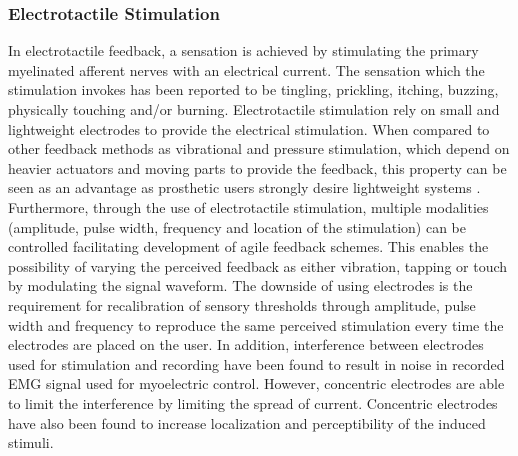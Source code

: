 \subsubsection{Electrotactile Stimulation} \label{E-stim}

In electrotactile feedback, a sensation is achieved by stimulating the primary myelinated afferent nerves with an electrical current. The sensation which the stimulation invokes has been reported to be tingling, prickling, itching, buzzing, physically touching and/or burning. \cite{Schofield2014} Electrotactile stimulation rely on small and lightweight electrodes to provide the electrical stimulation. When compared to other feedback methods as vibrational and pressure stimulation, which depend on heavier actuators and moving parts to provide the feedback, this property can be seen as an advantage as prosthetic users strongly desire lightweight systems \cite{Stephens-Fripp2018,Benz2016}. Furthermore, through the use of electrotactile stimulation, multiple modalities (amplitude, pulse width, frequency and location of the stimulation) can be controlled facilitating development of agile feedback schemes. This enables the possibility of varying the perceived feedback as either vibration, tapping or touch by modulating the signal waveform. The downside of using electrodes is the requirement for recalibration of sensory thresholds through amplitude, pulse width and frequency to reproduce the same perceived stimulation every time the electrodes are placed on the user. In addition, interference between electrodes used for stimulation and recording have been found to result in noise in recorded EMG signal used for myoelectric control. However, concentric electrodes are able to limit the interference by limiting the spread of current. Concentric electrodes have also been found to increase localization and perceptibility of the induced stimuli. \cite{Schofield2014,Stephens-Fripp2018,Antfolk2018} 







